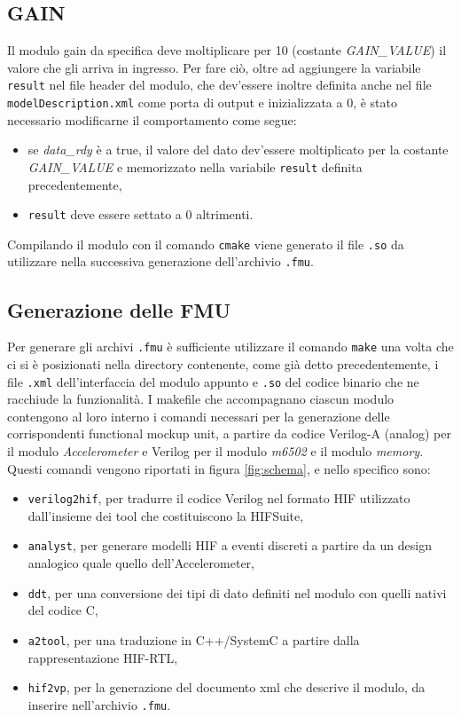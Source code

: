 \documentclass[]{IEEEtran}
\newcommand{\var}[1]{\textit{#1}}
\newcommand{\code}[1]{\texttt{#1}}
\begin{document}
\subsection{GAIN}
Il modulo gain da specifica deve moltiplicare per 10 (costante \var{GAIN\_VALUE}) il valore che gli arriva in ingresso. 
Per fare ci\`o, oltre ad aggiungere la variabile \texttt{result} nel file header del modulo, che dev'essere 
inoltre definita anche nel file \code{modelDescription.xml} come porta di output e inizializzata a 0, \`e stato 
necessario modificarne il comportamento come segue:
\begin{itemize}
    \item se \var{data\_rdy} \`e a true, il valore del dato dev'essere moltiplicato per la costante \var{GAIN\_VALUE} e
            memorizzato nella variabile \texttt{result} definita precedentemente,
    \item \texttt{result} deve essere settato a 0 altrimenti.
\end{itemize}
Compilando il modulo con il comando \texttt{cmake} viene generato il file \code{.so} da utilizzare nella 
successiva generazione dell'archivio \code{.fmu}. 

\subsection{Generazione delle FMU}
Per generare gli archivi \code{.fmu} è sufficiente utilizzare il comando \texttt{make} una volta che 
ci si \`e posizionati nella directory contenente, come gi\`a detto precedentemente, i file \code{.xml} dell'interfaccia 
del modulo appunto e \code{.so} del codice binario che ne racchiude la funzionalit\`a.
I makefile che accompagnano ciascun modulo contengono al loro interno i comandi necessari per la generazione delle 
corrispondenti functional mockup unit, a partire da codice Verilog-A (analog) per il modulo \emph{Accelerometer} e
Verilog per il modulo \emph{m6502} e il modulo \emph{memory}.
Questi comandi vengono riportati in figura \ref{fig:schema}, e nello specifico sono:
\begin{itemize}
    \item \texttt{verilog2hif}, per tradurre il codice Verilog nel formato HIF utilizzato dall'insieme dei 
    tool che costituiscono la HIFSuite,
    \item \texttt{analyst}, per generare modelli HIF a eventi discreti a partire da un design analogico quale
        quello dell'Accelerometer,
    \item \texttt{ddt}, per una conversione dei tipi di dato definiti nel modulo con quelli nativi del codice C,
    \item \texttt{a2tool}, per una traduzione in C++/SystemC a partire dalla rappresentazione HIF-RTL,
    \item \texttt{hif2vp}, per la generazione del documento xml che descrive il modulo, da inserire 
        nell'archivio \code{.fmu}.
\end{itemize}
\end{document}
